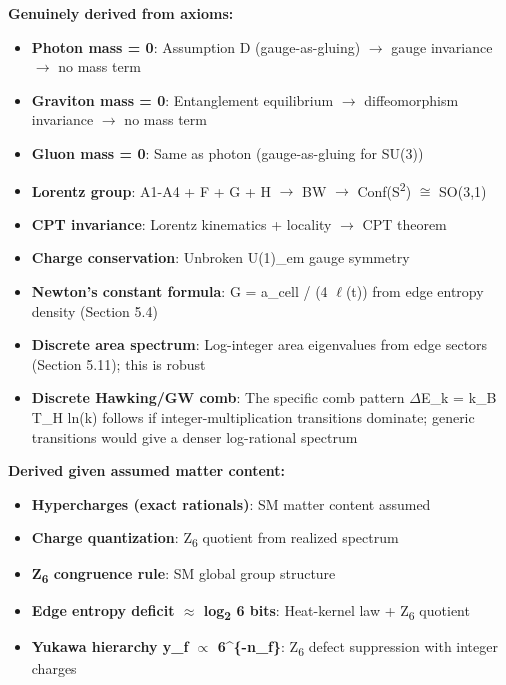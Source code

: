 \documentclass[11pt,a4paper]{article}
\theoremstyle{remark}
\providecommand{\tightlist}{%
  \setlength{\itemsep}{0pt}\setlength{\parskip}{0pt}}
\begin{document}
\textbf{Genuinely derived from axioms:}

\begin{itemize}
\tightlist
\item
  \textbf{Photon mass = 0}: Assumption D (gauge-as-gluing) \ensuremath{\to} gauge invariance \ensuremath{\to} no mass term
\item
  \textbf{Graviton mass = 0}: Entanglement equilibrium \ensuremath{\to} diffeomorphism invariance \ensuremath{\to} no mass term
\item
  \textbf{Gluon mass = 0}: Same as photon (gauge-as-gluing for SU(3))
\item
  \textbf{Lorentz group}: A1-A4 + F + G + H \ensuremath{\to} BW \ensuremath{\to} Conf(S\textsuperscript{2}) \ensuremath{\cong} SO(3,1)
\item
  \textbf{CPT invariance}: Lorentz kinematics + locality \ensuremath{\to} CPT theorem
\item
  \textbf{Charge conservation}: Unbroken U(1)\_em gauge symmetry
\item
  \textbf{Newton's constant formula}: G = a\_cell / (4 \ensuremath{\ell}(t)) from edge entropy density (Section 5.4)
\item
  \textbf{Discrete area spectrum}: Log-integer area eigenvalues from edge sectors (Section 5.11); this is robust
\item
  \textbf{Discrete Hawking/GW comb}: The specific comb pattern \ensuremath{\Delta}E\_k = k\_B T\_H ln(k) follows if integer-multiplication transitions dominate; generic transitions would give a denser log-rational spectrum
\end{itemize}

\textbf{Derived given assumed matter content:}

\begin{itemize}
\tightlist
\item
  \textbf{Hypercharges (exact rationals)}: SM matter content assumed
\item
  \textbf{Charge quantization}: Z\textsubscript{6} quotient from realized spectrum
\item
  \textbf{Z\textsubscript{6} congruence rule}: SM global group structure
\item
  \textbf{Edge entropy deficit \ensuremath{\approx} log\textsubscript{2} 6 bits}: Heat-kernel law + Z\textsubscript{6} quotient
\item
  \textbf{Yukawa hierarchy y\_f \ensuremath{\propto} 6\^{}\{-n\_f\}}: Z\textsubscript{6} defect suppression with integer charges
\end{itemize}
\end{document}
